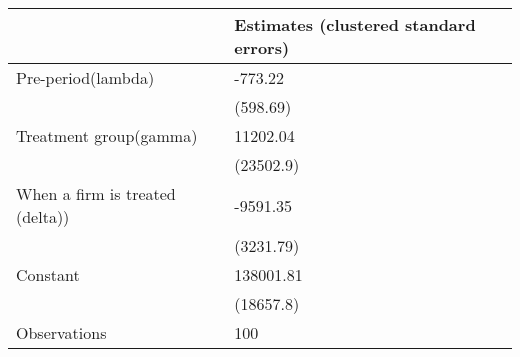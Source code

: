 \begin{tabular}{ll}
\toprule
{} & Estimates (clustered standard errors) \\
\midrule
Pre-period(lambda)              &                               -773.22 \\
                                &                              (598.69) \\
Treatment group(gamma)          &                              11202.04 \\
                                &                             (23502.9) \\
When a firm is treated (delta)) &                              -9591.35 \\
                                &                             (3231.79) \\
Constant                        &                             138001.81 \\
                                &                             (18657.8) \\
Observations                    &                                   100 \\
\bottomrule
\end{tabular}
